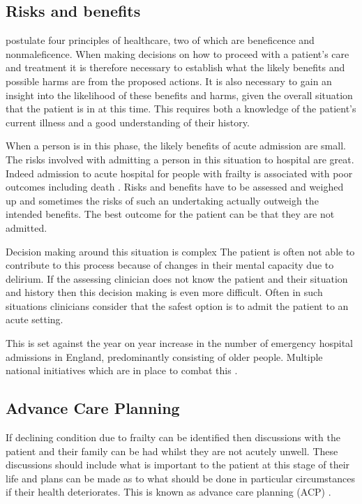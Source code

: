 \documentclass
[
	12pt,
	a4paper,
	oneside,
]{report}
\begin{document}
\subsection{Risks and benefits}
\label{sec:risk-ben}

\textcite{beauchampChildress:01} postulate four principles of healthcare, two
of which are beneficence and nonmaleficence.
When making decisions on how to proceed with a patient's care and treatment
it is therefore necessary to establish what the likely benefits and possible 
harms are from the proposed actions. It is also necessary to gain an insight 
into the likelihood of these benefits and harms, given the overall situation that
the patient is in at this time. This requires both a knowledge of the patient's 
current illness and a good understanding of their history.

When a person is in this phase, the likely benefits of acute admission are small.
The risks involved with admitting a person in this situation
to hospital are great.  
Indeed admission to acute hospital for people with frailty is associated with
poor outcomes including death \parencite{silver:12, wallis:15}. Risks and 
benefits have to be assessed and 
weighed up and sometimes the risks of such an undertaking actually
outweigh the intended benefits. The best outcome for the patient can be that 
they are not admitted. 

Decision making around this situation is complex 
The patient is often not able to contribute to this process because of changes 
in their
mental capacity due to delirium. If the assessing clinician does not know the 
patient and their situation and history then this decision making is even more 
difficult. Often in such situations clinicians consider that the safest option is to 
admit the patient to an acute setting.

This is set against the year on year increase in the number of emergency hospital 
admissions in England, predominantly consisting of older people. Multiple 
national initiatives which are in place to combat this \parencite{nao:18}.

\subsection{Advance Care Planning}

If declining condition due to frailty can be identified then discussions with the 
patient and their family can be had whilst they are not acutely unwell. These 
discussions should include what is important to the patient at this stage of their
life and plans can be made as to what should be done in particular circumstances
if their health deteriorates. This is known as advance care planning
(ACP) \parencite{jennings:18}.
\end{document}
